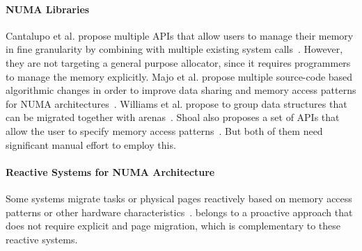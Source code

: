 \paragraph{NUMA Libraries}
Cantalupo et al. propose multiple APIs that allow users to manage their memory in fine granularity by combining with multiple existing system calls~\cite{cantalupo2015memkind}. However, they are not targeting a general purpose allocator, since it requires programmers to manage the memory explicitly.  Majo et al. propose multiple source-code based  algorithmic changes in order to improve data sharing and memory access patterns for NUMA architectures~\cite{6704666}. Williams et al. propose to group data structures that can be migrated together with arenas~\cite{WilliamsI0L18}. 
Shoal also proposes a set of APIs that allow the user to specify memory access patterns~\cite{Kaestle:2015:SSA:2813767.2813787}. 
But both of them need significant manual effort to employ this. 

\paragraph{Reactive Systems for NUMA Architecture} Some systems migrate tasks or physical pages reactively based on memory access patterns or other hardware characteristics~\cite{simplenuma, Blagodurov:2011:CNC:2002181.2002182, AutoNUMA, Dashti:2013:TMH:2451116.2451157, Lepers:2015:TMP:2813767.2813788}. 
\NM{} belongs to a proactive approach that does not require explicit and page migration, which is complementary to these reactive systems. 

